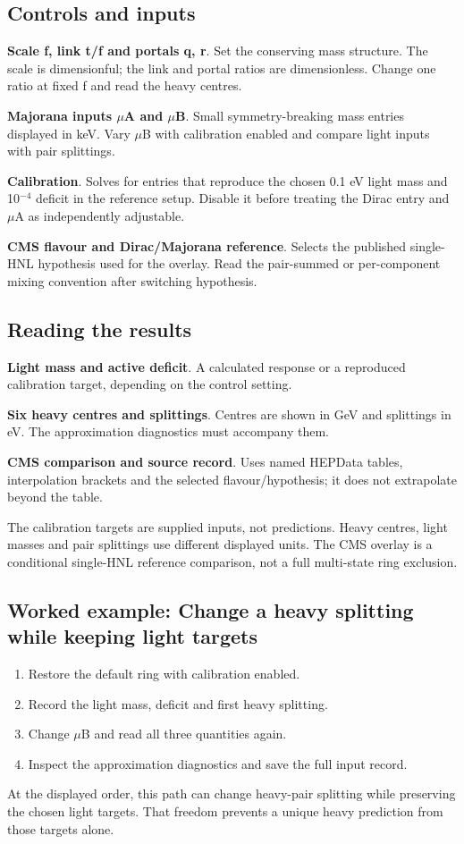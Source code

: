 \documentclass[11pt,a4paper]{article}
\begin{document}
\subsection*{Controls and inputs}
\textbf{Scale f, link t/f and portals q, r}. Set the conserving mass structure. The scale is dimensionful; the link and portal ratios are dimensionless. Change one ratio at fixed f and read the heavy centres.

\textbf{Majorana inputs \ensuremath{\mu}A and \ensuremath{\mu}B}. Small symmetry-breaking mass entries displayed in keV. Vary \ensuremath{\mu}B with calibration enabled and compare light inputs with pair splittings.

\textbf{Calibration}. Solves for entries that reproduce the chosen 0.1 eV light mass and 10\ensuremath{{}^{-4}} deficit in the reference setup. Disable it before treating the Dirac entry and \ensuremath{\mu}A as independently adjustable.

\textbf{CMS flavour and Dirac/Majorana reference}. Selects the published single-HNL hypothesis used for the overlay. Read the pair-summed or per-component mixing convention after switching hypothesis.

\subsection*{Reading the results}
\textbf{Light mass and active deficit}. A calculated response or a reproduced calibration target, depending on the control setting.

\textbf{Six heavy centres and splittings}. Centres are shown in GeV and splittings in eV. The approximation diagnostics must accompany them.

\textbf{CMS comparison and source record}. Uses named HEPData tables, interpolation brackets and the selected flavour/hypothesis; it does not extrapolate beyond the table.

The calibration targets are supplied inputs, not predictions. Heavy centres, light masses and pair splittings use different displayed units. The CMS overlay is a conditional single-HNL reference comparison, not a full multi-state ring exclusion.
\subsection*{Worked example: Change a heavy splitting while keeping light targets}
\begin{enumerate}
\item Restore the default ring with calibration enabled.
\item Record the light mass, deficit and first heavy splitting.
\item Change \ensuremath{\mu}B and read all three quantities again.
\item Inspect the approximation diagnostics and save the full input record.
\end{enumerate}
At the displayed order, this path can change heavy-pair splitting while preserving the chosen light targets. That freedom prevents a unique heavy prediction from those targets alone.
\end{document}
